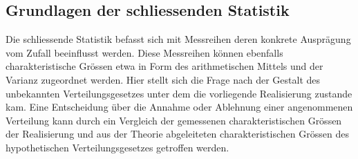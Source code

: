 \subsection{Grundlagen der schliessenden Statistik}
Die schliessende Statistik befasst sich mit Messreihen deren konkrete Ausprägung vom Zufall beeinflusst werden. Diese Messreihen können ebenfalls charakteristische Grössen etwa in Form des arithmetischen Mittels und der Varianz zugeordnet werden. Hier stellt sich die Frage nach der Gestalt des unbekannten Verteilungsgesetzes unter dem die vorliegende Realisierung zustande kam. Eine Entscheidung über die Annahme oder Ablehnung einer angenommenen Verteilung kann durch ein Vergleich der gemessenen charakteristischen Grössen der Realisierung und aus der Theorie abgeleiteten charakteristischen Grössen des hypothetischen Verteilungsgesetzes getroffen werden.
\pagebreak[2]
